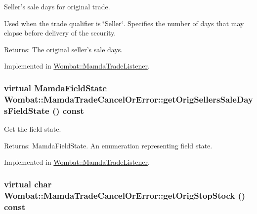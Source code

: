 Seller's sale days for original trade. 

Used when the trade qualifier is \char`\"{}Seller\char`\"{}. Specifies the number of days that may elapse before delivery of the security.

\begin{Desc}
\item[Returns:]The original seller's sale days. \end{Desc}


Implemented in \hyperlink{classWombat_1_1MamdaTradeListener_7020c24d5e41e1a14734ffd8673ac860}{Wombat::Mamda\-Trade\-Listener}.\hypertarget{classWombat_1_1MamdaTradeCancelOrError_75ac88d2442d768d3094a8263329adc2}{
\subsubsection[getOrigSellersSaleDaysFieldState]{\setlength{\rightskip}{0pt plus 5cm}virtual \hyperlink{namespaceWombat_93aac974f2ab713554fd12a1fa3b7d2a}{Mamda\-Field\-State} Wombat::Mamda\-Trade\-Cancel\-Or\-Error::get\-Orig\-Sellers\-Sale\-Days\-Field\-State () const}}
\label{classWombat_1_1MamdaTradeCancelOrError_75ac88d2442d768d3094a8263329adc2}


Get the field state. 

\begin{Desc}
\item[Returns:]Mamda\-Field\-State. An enumeration representing field state. \end{Desc}


Implemented in \hyperlink{classWombat_1_1MamdaTradeListener_e4e53df493af564fb26c91e1cf6f0a0e}{Wombat::Mamda\-Trade\-Listener}.\hypertarget{classWombat_1_1MamdaTradeCancelOrError_c7cf998aa454b310389b03c0b8be095e}{
\subsubsection[getOrigStopStock]{\setlength{\rightskip}{0pt plus 5cm}virtual char Wombat::Mamda\-Trade\-Cancel\-Or\-Error::get\-Orig\-Stop\-Stock () const}}
\label{classWombat_1_1MamdaTradeCancelOrError_c7cf998aa454b310389b03c0b8be095e}


